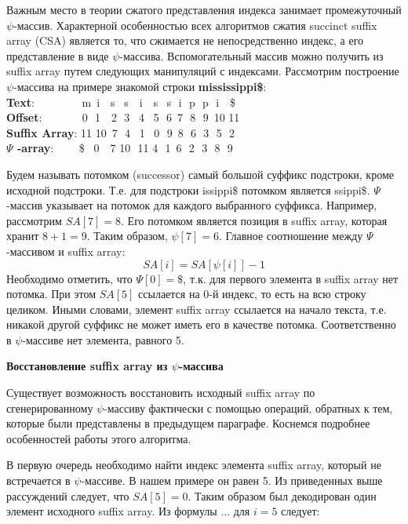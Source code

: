 Важным место в теории сжатого представления индекса занимает промежуточный $\psi$-массив.
Характерной особенностью всех алгоритмов сжатия succinct suffix array (CSA)
является то, что сжимается не непосредственно индекс, а его представление
в виде $\psi$-массива. Вспомогательный массив можно получить из suffix array путем следующих манипуляций с индексами.
\newpage
Рассмотрим построение $\psi$-массива на примере знакомой строки \textbf{mississippi\$}:
\\ \textbf{Text}:\,\,\,\,\,\,\,\,\,\,\,\,\,\,\,\,\,\,\,\,\,\,\,\, m \,i \,\,\,\,s \,\,\,s \,\,\,\,i \,\,\,\,s \,\,\,s \,\,i \,\,p \,\,p \,\,i \,\,\,\,\$
\\ \textbf{Offset}:\,\,\,\,\,\,\,\,\,\,\,\,\,\,\,\,\,\,\,\, 0 \,\,1 \,\,\,\,2 \,\,3 \,\,\,4 \,\,\,5 \,\,6 \,7 \,\,8 \,\,9 \,10 11
\\ \textbf{Suffix Array}:   11 10 \,7 \,\,4 \,\,\,1 \,\,\,0 \,\,9 \,8 \,\,6 \,\,3 \,\,5 \,\,2
\\ \textbf{$\Psi$ -array}: \,\,\,\,\,\,\,\,\,\,\,\,\$ \,\,\,0 \,\,\,\,7 10 \,\,11 4 \,\,1 \,6 \,\,2 \,\,3 \,\,8 \,\,9

Будем называть потомком (successor) самый большой суффикс подстроки, кроме исходной подстроки.
Т.е. для подстроки issippi\$ потомком является ssippi\$.
$\Psi$-массив указывает на потомок для каждого выбранного суффикса.
Например, рассмотрим $SA[7] = 8$. Его потомком является позиция в suffix array, которая хранит $8 + 1 = 9$.
Таким образом, $\psi[7] = 6$. Главное соотношение между $\Psi$-массивом и suffix array:
\[SA[i] = SA[\psi[i]] - 1\]
Необходимо отметить, что $\Psi[0] = \$$, т.к. для первого элемента в suffix array нет потомка.
При этом $SA[5]$ ссылается на 0-й индекс, то есть на всю строку целиком.
Иными словами, элемент suffix array ссылается на начало текста,
т.е. никакой другой суффикс не может иметь его в качестве потомка.
Соответственно в $\psi$-массиве нет элемента, равного 5.

\textbf{Восстановление suffix array из $\psi$-массива}

Существует возможность восстановить исходный suffix array по сгенерированному $\psi$-массиву
фактически с помощью операций, обратных к тем, которые были представлены в предыдущем параграфе.
Коснемся подробнее особенностей работы этого алгоритма.

В первую очередь необходимо найти индекс элемента suffix array, который не встречается в $\psi$-массиве.
В нашем примере он равен 5. Из приведенных выше рассуждений следует, что $SA[5] = 0$.
Таким образом был декодирован один элемент исходного suffix array. Из формулы ... для $i = 5$ следует:

